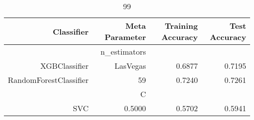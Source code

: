 
\begin{table}[H]
    \caption{99}
    \centering
    \begin{tabular}{|r|r|r|r|}
        \hline
        Classifier &Meta Parameter &Training Accuracy
        &Test Accuracy\\
        \hline
        &n\_estimators &\multicolumn{2}{|r|}{}\\
        \hline
        XGBClassifier &LasVegas &0.6877 &0.7195\\
        \hline
        RandomForestClassifier &59 &0.7240 &0.7261\\
        \hline
        &C &\multicolumn{2}{|r|}{}\\
        \hline
        SVC &0.5000 &0.5702 &0.5941\\
        \hline
    \end{tabular}
\end{table}
